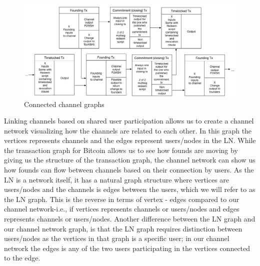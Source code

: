 \begin{figure}[h]
    \centering
    \includegraphics[width=14cm]{figures/graph_linking.png}
    \caption{Connected channel graphs}
    \label{fig:linking_graphs}
\end{figure}

Linking channels based on shared user participation allows us to create a channel network visualizing how the channels are related to each other.
In this graph the vertices represents channels and the edges represent users/nodes in the LN.
While the transaction graph for Bitcoin allows us to see how founds are moving by giving us the structure of the transaction graph, 
the channel network can show us how founds can flow between channels based on their connection by users.
As the LN is a network itself, it has a natural graph structure where vertices are users/nodes and the channels is edges between the users, which we will refer to as the LN graph.
This is the reverse in terms of vertex - edges compared to our channel network-i.e., if vertices represents channels or users/nodes and edges represents channels or users/nodes. Another difference between the LN graph and our channel network graph, is that the LN graph requires distinction between users/nodes as the vertices in that graph is a specific user; in our channel network the edges is any of the two users participating in the vertices connected to the edge.
\\

